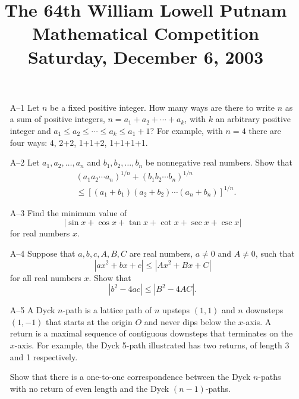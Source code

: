 \documentclass[amssymb,twocolumn,pra,10pt,aps]{revtex4-1}
\begin{document}
\title{The 64th William Lowell Putnam Mathematical Competition \\
    Saturday, December 6, 2003}
\maketitle

\begin{itemize}

\item[A--1]
Let $n$ be a fixed positive integer. How many ways are there to write  $n$
as a sum of positive integers,  $n = a_1 + a_2 + \cdots + a_k$,  with  $k$  an
arbitrary positive integer and  $a_1 \le a_2 \le \cdots \le a_k \le a_1  + 1$?
For example, with $n=4$ there are four ways: 4, 2+2, 1+1+2, 1+1+1+1.

\item[A--2]
Let $a_1, a_2, \dots, a_n$  and  $b_1, b_2, \dots, b_n$
be nonnegative real numbers.
Show that
\begin{align*}
& (a_1 a_2 \cdots a_n)^{1/n} + (b_1 b_2 \cdots b_n)^{1/n} \\
&\leq [(a_1+b_1) (a_2+b_2) \cdots (a_n + b_n) ]^{1/n}.
\end{align*}

\item[A--3]
Find the minimum value of
\[
  | \sin x + \cos x + \tan x + \cot x + \sec x + \csc x |
\]
for real numbers  $x$.

\item[A--4]
Suppose that $a,b,c,A,B,C$  are real numbers, $a\ne 0$ and $A \ne 0$, such that
\[
          | a x^2 + b x + c | \leq | A x^2 + B x + C |
\]
for all real numbers  $x$. Show that
\[
              | b^2 - 4 a c | \leq | B^2 - 4 A C |.
\]

\item[A--5]
A Dyck $n$-path is a lattice path of  $n$  upsteps $(1,1)$ and  $n$
  downsteps $(1,-1)$
that starts at the origin  $O$  and never dips below the  $x$-axis.
A return is a maximal sequence of contiguous downsteps that terminates
on the  $x$-axis. For example, the Dyck 5-path illustrated has two returns,
of length  3  and  1  respectively.
\begin{center}
\end{center}
Show that there is a one-to-one correspondence between the Dyck  $n$-paths
with no return of even length and the Dyck $(n-1)$-paths.


\end{itemize}
\end{document}

